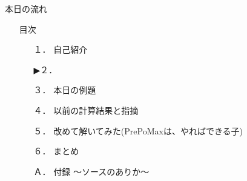 \begin{frame}{本日の流れ}
  \begin{itemize}
      \item[] 目次
    \begin{enumerate}[label=\textbf{ \arabic*.},itemsep=1.3ex, leftmargin=1cm]
        \item[１．] 自己紹介
        \item[▶２．] 
        \item[３．] 本日の例題
        \item[４．] 以前の計算結果と指摘
        \item[５．] 改めて解いてみた(PrePoMaxは、やればできる子)
        \item[６．] まとめ
        \item[Ａ．] 付録 ～ソースのありか～
    \end{enumerate}
  \end{itemize}
\end{frame}
